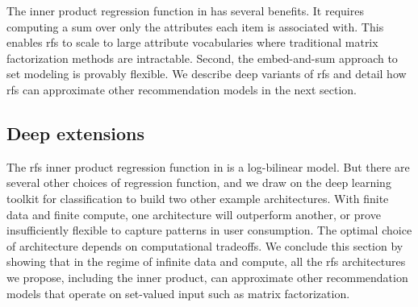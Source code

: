 The inner product regression function in  has several
benefits. It requires computing a sum over only the attributes each item is
associated with. This enables \gls{rfs} to scale to large attribute vocabularies
where traditional matrix factorization methods are intractable. Second, the
embed-and-sum approach to set modeling is provably flexible. We describe deep
variants of \gls{rfs} and detail how \gls{rfs} can approximate other
recommendation models in the next section.



\subsection{Deep extensions}

The \gls{rfs} inner product regression function in  is a
log-bilinear model. But there are several other choices of regression function,
and we draw on the deep learning toolkit for classification to build two other
example architectures. With finite data and finite compute, one architecture
will outperform another, or prove insufficiently flexible to capture patterns in
user consumption. The optimal choice of architecture depends on computational
tradeoffs. We conclude this section by showing that in the regime of infinite
data and compute, all the \gls{rfs} architectures we propose, including the
inner product, can approximate other recommendation models that operate on
set-valued input such as matrix factorization.

